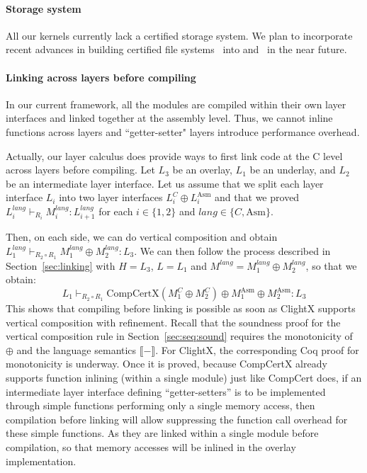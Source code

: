 \paragraph{Storage system}
All our kernels currently lack a certified storage system.
We plan to incorporate recent advances in building
certified file systems~\cite{fscq15,cogent16} into \mCTOS{} and \cCTOS\ in the near future.

\paragraph{Linking across layers before compiling}
In our current framework, all the modules are compiled
 within their own layer interfaces and linked together at the assembly level. Thus, we cannot inline functions across layers and ``getter-setter"
 layers introduce performance overhead.
 
Actually, our layer
calculus does provide ways to first link code at the C level across
layers before compiling. Let $L_3$ be an overlay, $L_1$ be an
underlay, and $L_2$ be an intermediate layer interface. Let us assume that we
split each layer interface $L_i$ into two layer interfaces $L_i^C \oplus
L_i^{\mathrm{Asm}}$ and that we proved $L_{i}^{\mathit{lang}} \vdash_{R_i}
M_i^{\mathit{lang}}: L_{i+1}^{\mathit{lang}}$ for each $i \in \{1,2
\}$ and $\mathit{lang} \in \{ C, \mathrm{Asm} \}$.

Then, on each side, we can do vertical composition and obtain
$L_1^{\mathit{lang}} \vdash_{R_2 \circ R_1} M_1^{\mathit{lang}} \oplus
M_2^{\mathit{lang}} : L_3$. We can then follow the process described
in Section~\ref{sec:linking} with $H = L_3$, $L = L_1$ and
$M^{\mathit{lang}} = M_1^{\mathit{lang}} \oplus M_2^{\mathit{lang}}$, so that we obtain:
\[
L_1 \vdash_{R_2 \circ R_1} \mathrm{CompCertX}(M_1^C \oplus M_2^C) \oplus M_1^{\mathrm{Asm}} \oplus M_2^{\mathrm{Asm}}: L_3
\]
This shows that compiling before linking is possible as soon as
ClightX supports vertical composition with refinement. 
Recall that the soundness proof for the vertical composition rule in Section~\ref{sec:seq:sound}
requires the monotonicity of $\oplus$ and the language semantics $\llbracket - \rrbracket$.
For ClightX,
the
corresponding Coq proof for monotonicity is underway. 
Once it is proved, because CompCertX already
supports function inlining (within a single module) just like CompCert
does, if an intermediate layer interface defining ``getter-setters'' is to be
implemented through simple functions performing only a single memory
access, then compilation before linking will allow suppressing the
function call overhead for these simple functions. 
As they are linked
within a single module before compilation, so that memory accesses
will be inlined in the overlay implementation.



